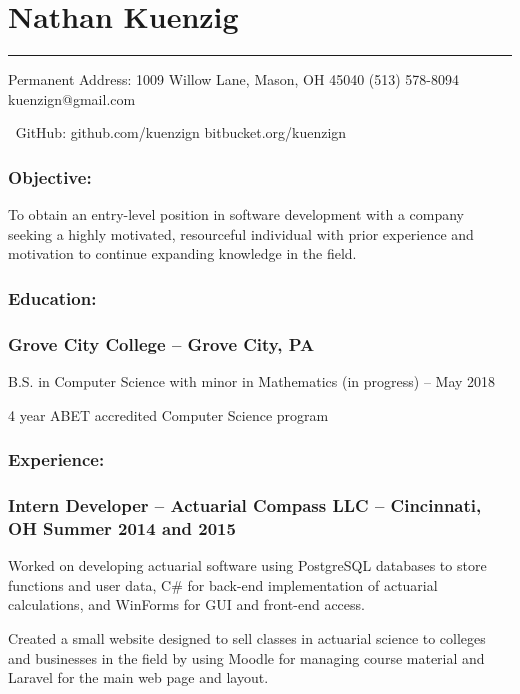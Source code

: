 \documentclass[12pt]{article}
\begin{document}
{
\centering\section*{\color{head}Nathan Kuenzig}
\vspace{-7mm}
\noindent\color{head2}\rule{\textwidth}{1pt}

{\footnotesize {\color{accent}Permanent Address:} 1009 Willow Lane, Mason, OH 45040  (513) 578-8094  kuenzign@gmail.com

{\color{accent}\faGithub $\:$ GitHub:} github.com/kuenzign  bitbucket.org/kuenzign}

}
\vspace{-5mm}
\subsubsection*{\color{head}Objective:}
\small To obtain an entry-level position in software development with a company seeking a highly motivated, resourceful individual with prior experience and motivation to continue expanding knowledge in the field.

\subsubsection*{\color{head}Education:}
\subsubsection*{\textnormal{{\color{accent} Grove City College }\color{head} -- Grove City, PA}}
\vspace{-2mm}
\noindent\hspace{2.25pc} B.S. in Computer Science with minor in Mathematics (in progress) -- May 2018

\noindent\hspace{2.25pc} 4 year ABET accredited Computer Science program

\subsubsection*{\color{head}Experience:}
\subsubsection*{\textnormal{{\color{accent} Intern Developer }\color{head} -- Actuarial Compass LLC -- Cincinnati, OH	\hfill Summer 2014 and 2015}}
\vspace{-2mm}
\begin{compactitem}
	\item Worked on developing actuarial software using PostgreSQL databases to store functions and user data, C\# for back-end implementation of actuarial calculations, and WinForms for GUI and front-end access.
	\item Created a small website designed to sell classes in actuarial science to colleges and businesses in the field by using Moodle for managing course material and Laravel for the main web page and layout.
\end{compactitem}
\vspace{-4.5mm}
\end{document}
